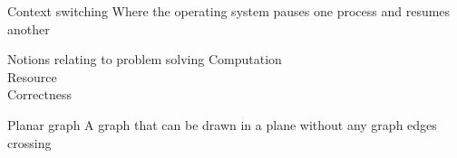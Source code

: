 \documentclass[grid,avery5371]{flashcards}
\begin{document}
\begin{flashcard}[]{Context switching}
	Where the operating system pauses one process and resumes another
\end{flashcard}

\begin{flashcard}[]{Notions relating to problem solving}
	Computation\\
	Resource\\
	Correctness
\end{flashcard}

\begin{flashcard}[]{Planar graph}
	A graph that can be drawn in a plane without any graph edges crossing
\end{flashcard}
\end{document}

